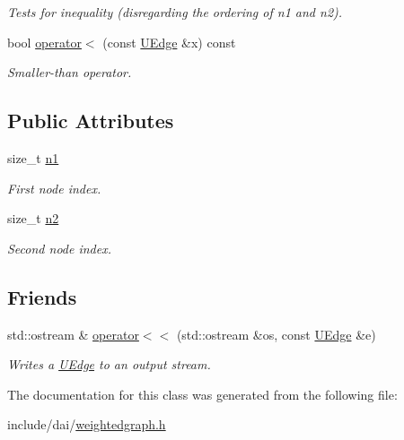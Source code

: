 \begin{CompactItemize}
\begin{CompactList}\small\item\em Tests for inequality (disregarding the ordering of n1 and n2). \item\end{CompactList}\item 
\hypertarget{classdai_1_1UEdge_c18760d5642f14aa1b64e0d3c611cb0f}{
bool \hyperlink{classdai_1_1UEdge_c18760d5642f14aa1b64e0d3c611cb0f}{operator$<$} (const \hyperlink{classdai_1_1UEdge}{UEdge} \&x) const }
\label{classdai_1_1UEdge_c18760d5642f14aa1b64e0d3c611cb0f}

\begin{CompactList}\small\item\em Smaller-than operator. \item\end{CompactList}\end{CompactItemize}
\subsection*{Public Attributes}
\begin{CompactItemize}
\item 
\hypertarget{classdai_1_1UEdge_d977fc954195ab7913c57d50639da25c}{
size\_\-t \hyperlink{classdai_1_1UEdge_d977fc954195ab7913c57d50639da25c}{n1}}
\label{classdai_1_1UEdge_d977fc954195ab7913c57d50639da25c}

\begin{CompactList}\small\item\em First node index. \item\end{CompactList}\item 
\hypertarget{classdai_1_1UEdge_f2c3cb4413b81fe69fcc4cbedbd17723}{
size\_\-t \hyperlink{classdai_1_1UEdge_f2c3cb4413b81fe69fcc4cbedbd17723}{n2}}
\label{classdai_1_1UEdge_f2c3cb4413b81fe69fcc4cbedbd17723}

\begin{CompactList}\small\item\em Second node index. \item\end{CompactList}\end{CompactItemize}
\subsection*{Friends}
\begin{CompactItemize}
\item 
\hypertarget{classdai_1_1UEdge_d723be19b6d346867d5477ae26cc4bf1}{
std::ostream \& \hyperlink{classdai_1_1UEdge_d723be19b6d346867d5477ae26cc4bf1}{operator$<$$<$} (std::ostream \&os, const \hyperlink{classdai_1_1UEdge}{UEdge} \&e)}
\label{classdai_1_1UEdge_d723be19b6d346867d5477ae26cc4bf1}

\begin{CompactList}\small\item\em Writes a \hyperlink{classdai_1_1UEdge}{UEdge} to an output stream. \item\end{CompactList}\end{CompactItemize}


The documentation for this class was generated from the following file:\begin{CompactItemize}
\item 
include/dai/\hyperlink{weightedgraph_8h}{weightedgraph.h}\end{CompactItemize}
